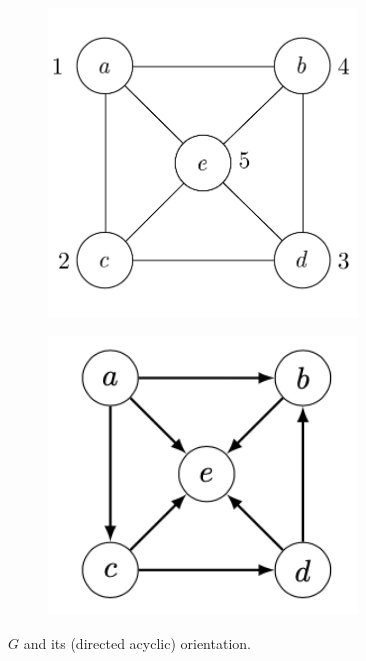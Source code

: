 \begin{figure}
  \centering
  \begin{subfigure}{0.4\textwidth}
	  \includegraphics[width=0.9\textwidth]{graphics_included/ordered_undirected_graph}
	    \label{figure:ordered_undirected_graph_orientations:ordered_undirected_graph}
  \end{subfigure}
  \begin{subfigure}{0.4\textwidth}
    \includegraphics[width=0.9\textwidth]{graphics_included/directed_ordered_undirected_graph}  	
    	\label{figure:ordered_undirected_graph_orientations:directed_ordered_undirected_graph}
  \end{subfigure}
  \caption{$G$ and its (directed acyclic) orientation.}
  \label{figure:ordered_undirected_graph_orientations:main}
\end{figure}



